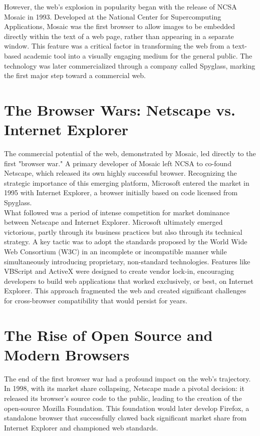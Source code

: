 \documentclass{scrbook}
\begin{document}
However, the web's explosion in popularity began with the release of NCSA Mosaic in 1993. Developed at the National Center for Supercomputing Applications, Mosaic was the first browser to allow images to be embedded directly within the text of a web page, rather than appearing in a separate window. This feature was a critical factor in transforming the web from a text-based academic tool into a visually engaging medium for the general public. The technology was later commercialized through a company called Spyglass, marking the first major step toward a commercial web.

\section{The Browser Wars: Netscape vs. Internet Explorer}

The commercial potential of the web, demonstrated by Mosaic, led directly to the first "browser war." A primary developer of Mosaic left NCSA to co-found Netscape, which released its own highly successful browser. Recognizing the strategic importance of this emerging platform, Microsoft entered the market in 1995 with Internet Explorer, a browser initially based on code licensed from Spyglass. \\

What followed was a period of intense competition for market dominance between Netscape and Internet Explorer. Microsoft ultimately emerged victorious, partly through its business practices but also through its technical strategy. A key tactic was to adopt the standards proposed by the World Wide Web Consortium (W3C) in an incomplete or incompatible manner while simultaneously introducing proprietary, non-standard technologies. Features like VBScript and ActiveX were designed to create vendor lock-in, encouraging developers to build web applications that worked exclusively, or best, on Internet Explorer. This approach fragmented the web and created significant challenges for cross-browser compatibility that would persist for years.

\section{The Rise of Open Source and Modern Browsers}

The end of the first browser war had a profound impact on the web's trajectory. In 1998, with its market share collapsing, Netscape made a pivotal decision: it released its browser's source code to the public, leading to the creation of the open-source Mozilla Foundation. This foundation would later develop Firefox, a standalone browser that successfully clawed back significant market share from Internet Explorer and championed web standards. \\
\end{document}
